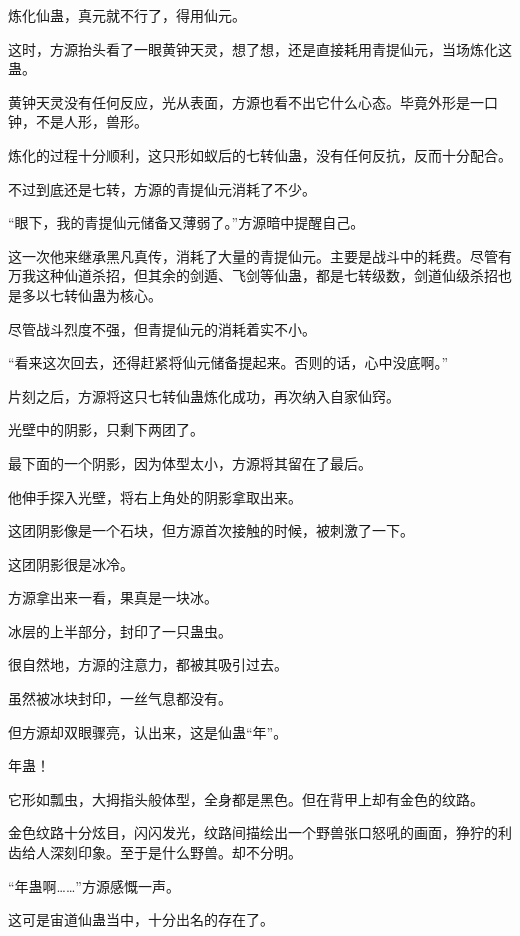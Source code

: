 
\begin{this_body}

炼化仙蛊，真元就不行了，得用仙元。

这时，方源抬头看了一眼黄钟天灵，想了想，还是直接耗用青提仙元，当场炼化这蛊。

黄钟天灵没有任何反应，光从表面，方源也看不出它什么心态。毕竟外形是一口钟，不是人形，兽形。

炼化的过程十分顺利，这只形如蚁后的七转仙蛊，没有任何反抗，反而十分配合。

不过到底还是七转，方源的青提仙元消耗了不少。

“眼下，我的青提仙元储备又薄弱了。”方源暗中提醒自己。

这一次他来继承黑凡真传，消耗了大量的青提仙元。主要是战斗中的耗费。尽管有万我这种仙道杀招，但其余的剑遁、飞剑等仙蛊，都是七转级数，剑道仙级杀招也是多以七转仙蛊为核心。

尽管战斗烈度不强，但青提仙元的消耗着实不小。

“看来这次回去，还得赶紧将仙元储备提起来。否则的话，心中没底啊。”

片刻之后，方源将这只七转仙蛊炼化成功，再次纳入自家仙窍。

光壁中的阴影，只剩下两团了。

最下面的一个阴影，因为体型太小，方源将其留在了最后。

他伸手探入光壁，将右上角处的阴影拿取出来。

这团阴影像是一个石块，但方源首次接触的时候，被刺激了一下。

这团阴影很是冰冷。

方源拿出来一看，果真是一块冰。

冰层的上半部分，封印了一只蛊虫。

很自然地，方源的注意力，都被其吸引过去。

虽然被冰块封印，一丝气息都没有。

但方源却双眼骤亮，认出来，这是仙蛊“年”。

年蛊！

它形如瓢虫，大拇指头般体型，全身都是黑色。但在背甲上却有金色的纹路。

金色纹路十分炫目，闪闪发光，纹路间描绘出一个野兽张口怒吼的画面，狰狞的利齿给人深刻印象。至于是什么野兽。却不分明。

“年蛊啊……”方源感慨一声。

这可是宙道仙蛊当中，十分出名的存在了。


\end{this_body}

